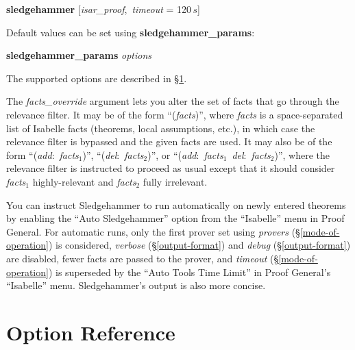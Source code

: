 \documentclass[a4paper,12pt]{article}
\begin{document}
\prew
\textbf{sledgehammer} [\textit{isar\_proof}, \,\textit{timeout} = 120$\,s$]
\postw

Default values can be set using \textbf{sledgehammer\_\allowbreak params}:

\prew
\textbf{sledgehammer\_params} \textit{options}
\postw

The supported options are described in \S\ref{option-reference}.

The \textit{facts\_override} argument lets you alter the set of facts that go
through the relevance filter. It may be of the form ``(\textit{facts})'', where
\textit{facts} is a space-separated list of Isabelle facts (theorems, local
assumptions, etc.), in which case the relevance filter is bypassed and the given
facts are used. It may also be of the form ``(\textit{add}:\ \textit{facts}$_1$)'',
``(\textit{del}:\ \textit{facts}$_2$)'', or ``(\textit{add}:\ \textit{facts}$_1$\
\textit{del}:\ \textit{facts}$_2$)'', where the relevance filter is instructed to
proceed as usual except that it should consider \textit{facts}$_1$
highly-relevant and \textit{facts}$_2$ fully irrelevant.

You can instruct Sledgehammer to run automatically on newly entered theorems by
enabling the ``Auto Sledgehammer'' option from the ``Isabelle'' menu in Proof
General. For automatic runs, only the first prover set using \textit{provers}
(\S\ref{mode-of-operation}) is considered, \textit{verbose}
(\S\ref{output-format}) and \textit{debug} (\S\ref{output-format}) are disabled,
fewer facts are passed to the prover, and \textit{timeout}
(\S\ref{mode-of-operation}) is superseded by the ``Auto Tools Time Limit'' in
Proof General's ``Isabelle'' menu. Sledgehammer's output is also more concise.

\section{Option Reference}
\label{option-reference}
\end{document}
